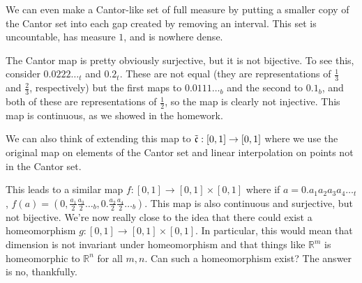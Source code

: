 We can even make a Cantor-like set of full measure by putting a smaller copy of the Cantor set into each gap created by removing an interval.  This set is uncountable, has measure $1$, and is nowhere dense.


The Cantor map is pretty obviously surjective, but it is not bijective.  To see this, consider $0.0222\dots_t$ and $0.2_t$.  These are not equal (they are representations of $\frac{1}{3}$ and $\frac{2}{3}$, respectively) but the first maps to $0.0111\dots_b$ and the second to $0.1_b$, and both of these are representations of $\frac{1}{2}$, so the map is clearly not injective.  This map is continuous, as we showed in the homework.

We can also think of extending this map to $\tilde{\frak{c}}:[0,1]\rightarrow [0,1]$ where we use the original map on elements of the Cantor set and linear interpolation on points not in the Cantor set.

This leads to a similar map $f:[0,1]\rightarrow [0,1]\times [0,1]$ where if $a=0.a_1a_2a_3a_4\dots_t$, $f(a)=(0,\frac{a_1}{2}\frac{a_3}{2}\dots_b, 0.\frac{a_2}{2}\frac{a_4}{2}\dots_b)$.  This map is also continuous and surjective, but not bijective.  We're now really close to the idea that there could exist a homeomorphism $g:[0,1]\rightarrow [0,1]\times[0,1]$.  In particular, this would mean that dimension is not invariant under homeomorphism and that things like $\mathbb{R}^m$ is homeomorphic to $\mathbb{R}^n$ for all $m,n$.  Can such a homeomorphism exist?  The answer is no, thankfully. 